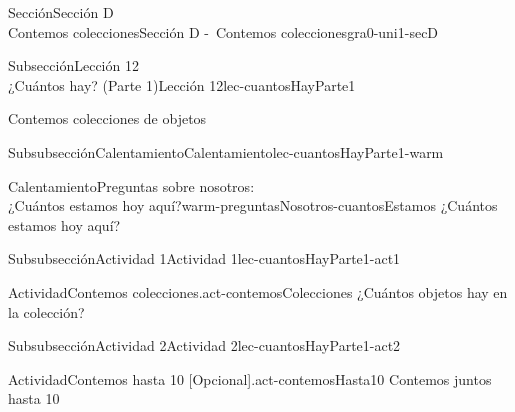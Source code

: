 %
\begin{sectionptx}{Sección}{{\Large Sección D\\}Contemos colecciones}{}{Sección D -~Contemos colecciones}{}{}{gra0-uni1-secD}
%
%
\typeout{************************************************}
\typeout{************************************************}
%
\begin{subsectionptx}{Subsección}{{\normalsize Lección 12\\[-0.05cm]}¿Cuántos hay? (Parte 1)}{}{Lección 12}{}{}{lec-cuantosHayParte1}
\begin{introduction}{}%
Contemos colecciones de objetos%
\end{introduction}%
%
%
\typeout{************************************************}
\typeout{************************************************}
%
\begin{subsubsectionptx}{Subsubsección}{Calentamiento}{}{Calentamiento}{}{}{lec-cuantosHayParte1-warm}
\begin{exploration}{Calentamiento}{Preguntas sobre nosotros:\\¿Cuántos estamos hoy aquí?}{warm-preguntasNosotros-cuantosEstamos}%
¿Cuántos estamos hoy aquí?%
\end{exploration}%
\end{subsubsectionptx}
%
%
\typeout{************************************************}
\typeout{************************************************}
%
\begin{subsubsectionptx}{Subsubsección}{Actividad 1}{}{Actividad 1}{}{}{lec-cuantosHayParte1-act1}
\begin{activity}{Actividad}{Contemos colecciones.}{act-contemosColecciones}%
¿Cuántos objetos hay en la colección?%
\end{activity}%
\end{subsubsectionptx}
%
%
\typeout{************************************************}
\typeout{************************************************}
%
\begin{subsubsectionptx}{Subsubsección}{Actividad 2}{}{Actividad 2}{}{}{lec-cuantosHayParte1-act2}
\begin{activity}{Actividad}{Contemos hasta 10 [Opcional].}{act-contemosHasta10}%
Contemos juntos hasta 10%
\end{activity}%
\end{subsubsectionptx}
%
%
\typeout{************************************************}

\end{subsectionptx}
\end{sectionptx}
